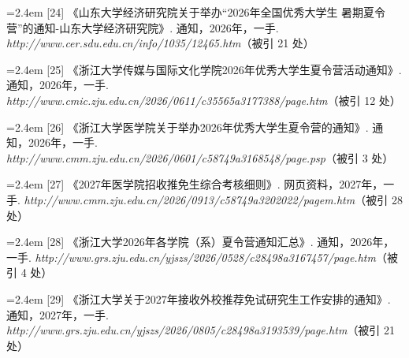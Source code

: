 {\vspace{0.6pt}
\vspace{3.5pt}\par
\nopagebreak\vspace{1pt}
\noindent\hangindent=2.4em \label{src:S0026}{\color{cAccent}[24]} 《山东大学经济研究院关于举办“2026年全国优秀大学生 暑期夏令营”的通知-山东大学经济研究院》. 通知，2026年，一手. \textit{http://www.cer.sdu.edu.cn/info/1035/12465.htm}（被引 21 处）\par
\vspace{0.6pt}
\vspace{3.5pt}\par
\nopagebreak\vspace{1pt}
\noindent\hangindent=2.4em \label{src:S0027}{\color{cAccent}[25]} 《浙江大学传媒与国际文化学院2026年优秀大学生夏令营活动通知》. 通知，2026年，一手. \textit{http://www.cmic.zju.edu.cn/2026/0611/c35565a3177388/page.htm}（被引 12 处）\par
\vspace{0.6pt}
\noindent\hangindent=2.4em \label{src:S0028}{\color{cAccent}[26]} 《浙江大学医学院关于举办2026年优秀大学生夏令营的通知》. 通知，2026年，一手. \textit{http://www.cmm.zju.edu.cn/2026/0601/c58749a3168548/page.psp}（被引 3 处）\par
\vspace{0.6pt}
\noindent\hangindent=2.4em \label{src:S0029}{\color{cAccent}[27]} 《2027年医学院招收推免生综合考核细则》. 网页资料，2027年，一手. \textit{http://www.cmm.zju.edu.cn/2026/0913/c58749a3202022/pagem.htm}（被引 28 处）\par
\vspace{0.6pt}
\noindent\hangindent=2.4em \label{src:S0031}{\color{cAccent}[28]} 《浙江大学2026年各学院（系）夏令营通知汇总》. 通知，2026年，一手. \textit{http://www.grs.zju.edu.cn/yjszs/2026/0528/c28498a3167457/page.htm}（被引 4 处）\par
\vspace{0.6pt}
\noindent\hangindent=2.4em \label{src:S0032}{\color{cAccent}[29]} 《浙江大学关于2027年接收外校推荐免试研究生工作安排的通知》. 通知，2027年，一手. \textit{http://www.grs.zju.edu.cn/yjszs/2026/0805/c28498a3193539/page.htm}（被引 21 处）\par
\vspace{0.6pt}
\vspace{3.5pt}\par
}
